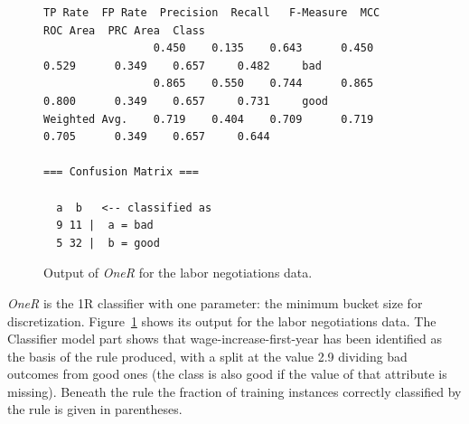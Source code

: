 \begin{figure}[!p]
\begin{mdframed}[innermargin=-1.5cm]
\begin{Verbatim}[fontsize=\scriptsize]
                 TP Rate  FP Rate  Precision  Recall   F-Measure  MCC      ROC Area  PRC Area  Class
                 0.450    0.135    0.643      0.450    0.529      0.349    0.657     0.482     bad
                 0.865    0.550    0.744      0.865    0.800      0.349    0.657     0.731     good
Weighted Avg.    0.719    0.404    0.709      0.719    0.705      0.349    0.657     0.644     

=== Confusion Matrix ===

  a  b   <-- classified as
  9 11 |  a = bad
  5 32 |  b = good
\end{Verbatim}
\end{mdframed}
\caption{\label{fig:oneR_output}Output of \textit{OneR} for the labor negotiations data.}
\end{figure}

\textit{OneR} is the 1R classifier with one parameter: the minimum
bucket size for discretization. Figure~\ref{fig:oneR_output} shows its
output for the labor negotiations data. The Classifier model part
shows that wage-increase-first-year has been identified as the basis
of the rule produced, with a split at the value 2.9 dividing bad
outcomes from good ones (the class is also good if the value of that
attribute is missing). Beneath the rule the fraction of training
instances correctly classified by the rule is given in parentheses.

